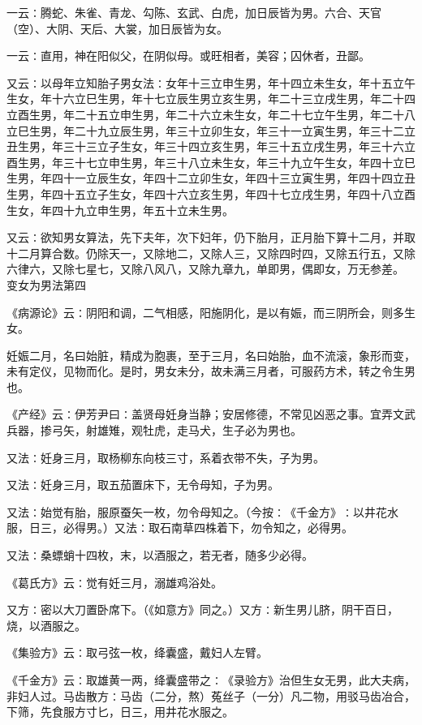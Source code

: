 \documentclass[a4paper,12pt,UTF8,twoside]{ctexbook}
\begin{document}
一云∶腾蛇、朱雀、青龙、勾陈、玄武、白虎，加日辰皆为男。六合、天官（空）、大阴、天后、大裳，加日辰皆为女。

一云∶直用，神在阳似父，在阴似母。或旺相者，美容；囚休者，丑鄙。

又云∶以母年立知胎子男女法∶女年十三立申生男，年十四立未生女，年十五立午生女，年十六立巳生男，年十七立辰生男立亥生男，年二十三立戌生男，年二十四立酉生男，年二十五立申生男，年二十六立未生女，年二十七立午生男，年二十八立巳生男，年二十九立辰生男，年三十立卯生女，年三十一立寅生男，年三十二立丑生男，年三十三立子生女，年三十四立亥生男，年三十五立戌生男，年三十六立酉生男，年三十七立申生男，年三十八立未生女，年三十九立午生女，年四十立巳生男，年四十一立辰生女，年四十二立卯生女，年四十三立寅生男，年四十四立丑生男，年四十五立子生女，年四十六立亥生男，年四十七立戌生男，年四十八立酉生女，年四十九立申生男，年五十立未生男。

又云∶欲知男女算法，先下夫年，次下妇年，仍下胎月，正月胎下算十二月，并取十二月算合数。仍除天一，又除地二，又除人三，又除四时四，又除五行五，又除六律六，又除七星七，又除八风八，又除九章九，单即男，偶即女，万无参差。
变女为男法第四

《病源论》云∶阴阳和调，二气相感，阳施阴化，是以有娠，而三阴所会，则多生女。

妊娠二月，名曰始脏，精成为胞裹，至于三月，名曰始胎，血不流滚，象形而变，未有定仪，见物而化。是时，男女未分，故未满三月者，可服药方术，转之令生男也。

《产经》云∶伊芳尹曰∶盖贤母妊身当静；安居修德，不常见凶恶之事。宜弄文武兵器，掺弓矢，射雄雉，观牡虎，走马犬，生子必为男也。

又法∶妊身三月，取杨柳东向枝三寸，系着衣带不失，子为男。

又法∶妊身三月，取五茄置床下，无令母知，子为男。

又法∶始觉有胎，服原蚕矢一枚，勿令母知之。（今按∶《千金方》∶以井花水服，日三，必得男。）又法∶取石南草四株着下，勿令知之，必得男。

又法∶桑螵蛸十四枚，末，以酒服之，若无者，随多少必得。

《葛氏方》云∶觉有妊三月，溺雄鸡浴处。

又方∶密以大刀置卧席下。（《如意方》同之。）又方∶新生男儿脐，阴干百日，烧，以酒服之。

《集验方》云∶取弓弦一枚，绛囊盛，戴妇人左臂。

《千金方》云∶取雄黄一两，绛囊盛带之∶《录验方》治但生女无男，此大夫病，非妇人过。马齿散方∶马齿（二分，熬）菟丝子（一分）凡二物，用驳马齿冶合，下筛，先食服方寸匕，日三，用井花水服之。
\end{document}
